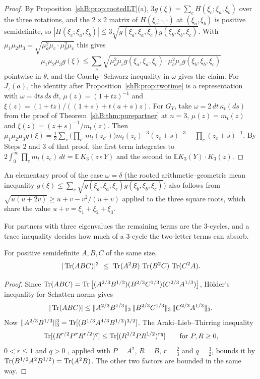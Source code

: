 \begin{proof}
By Proposition~\ref{shB:prop:rootedLT}(a), $3g(\xi)=\sum_cH(\xi_c;\xi_a,\xi_b)$ over the three rotations, and the $2\times2$ matrix of $H(\xi_c;\cdot,\cdot)$ at $(\xi_a,\xi_b)$ is positive semidefinite, so $|H(\xi_c;\xi_a,\xi_b)|\le3\sqrt{g(\xi_a,\xi_a,\xi_c)g(\xi_b,\xi_b,\xi_c)}$. With $\mu_1\mu_2\mu_3=\sqrt{\mu_a^2\mu_c\cdot\mu_b^2\mu_c}$ this gives
\[\mu_1\mu_2\mu_3g(\xi)\le\sum_c\sqrt{\mu_a^2\mu_cg(\xi_a,\xi_a,\xi_c)\cdot\mu_b^2\mu_cg(\xi_b,\xi_b,\xi_c)}
\]
pointwise in $\theta$, and the Cauchy--Schwarz inequality in $\omega$ gives the claim. For $J_z(a)$, the identity after Proposition~\ref{shB:prop:twotime} is a representation with $\omega=4ts\,ds\,dt$, $\mu(z)=(1+tz)^{-1}$ and $\xi(z)=(1+tz)/((1+s)+t(a+s)z)$. For $G_Y$, take $\omega=2\,dt\,\kappa_t(ds)$ from the proof of Theorem~\ref{shB:thm:purepartner} at $n=3$, $\mu(z)=m_t(z)$ and $\xi(z)=(z+s)^{-1}/m_t(z)$. Then $\mu_1\mu_2\mu_3g(\xi)=\frac13\sum_c\big(\prod_{c'}m_t(z_{c'})\big)m_t(z_c)^{-3}(z_c+s)^{-3}-\prod_c(z_c+s)^{-1}$. By Steps 2 and 3 of that proof, the first term integrates to $2\int_0^\infty\prod_cm_t(z_c)\,dt=\mathbb E\,K_3(z\circ Y)$ and the second to $\mathbb E K_3(Y)\cdot K_3(z)$.
\end{proof}

An elementary proof of the case $\omega=\delta$ (the rooted arithmetic--geometric mean inequality $g(\xi)\le\sum_c\sqrt{g(\xi_a,\xi_a,\xi_c)g(\xi_b,\xi_b,\xi_c)}$) also follows from $\sqrt{u(u+2v)}\ge u+v-v^2/(u+v)$ applied to the three square roots, which share the value $u+v=\xi_1+\xi_2+\xi_3$.

For partners with three eigenvalues the remaining terms are the $3$-cycles, and a trace inequality decides how much of a $3$-cycle the two-letter terms can absorb.

\begin{theorem}\label{shB:thm:cycle}
For positive semidefinite $A,B,C$ of the same size,
\[
|\Tr(ABC)|^3\ \le\ \Tr(A^2B)\,\Tr(B^2C)\,\Tr(C^2A).
\]
\end{theorem}

\begin{proof}
Since $\operatorname{Tr}(ABC)=\operatorname{Tr}\big[(A^{2/3}B^{1/3})(B^{2/3}C^{1/3})(C^{2/3}A^{1/3})\big]$, H\"older's inequality for Schatten norms gives
\[
|\operatorname{Tr}(ABC)|\le\|A^{2/3}B^{1/3}\|_3\,\|B^{2/3}C^{1/3}\|_3\,\|C^{2/3}A^{1/3}\|_3 .
\] Now $\|A^{2/3}B^{1/3}\|_3^3=\operatorname{Tr}[(B^{1/3}A^{4/3}B^{1/3})^{3/2}]$. The Araki--Lieb--Thirring inequality
\[
\operatorname{Tr}[(R^{r/2}P^rR^{r/2})^q]\le\operatorname{Tr}[(R^{1/2}PR^{1/2})^{rq}]\qquad\text{for }P,R\ge0,
\] $0<r\le1$ and $q>0$ \cite{Araki1990}, applied with $P=A^2$, $R=B$, $r=\frac23$ and $q=\frac32$, bounds it by $\operatorname{Tr}(B^{1/2}A^2B^{1/2})=\operatorname{Tr}(A^2B)$. The other two factors are bounded in the same way.
\end{proof}


